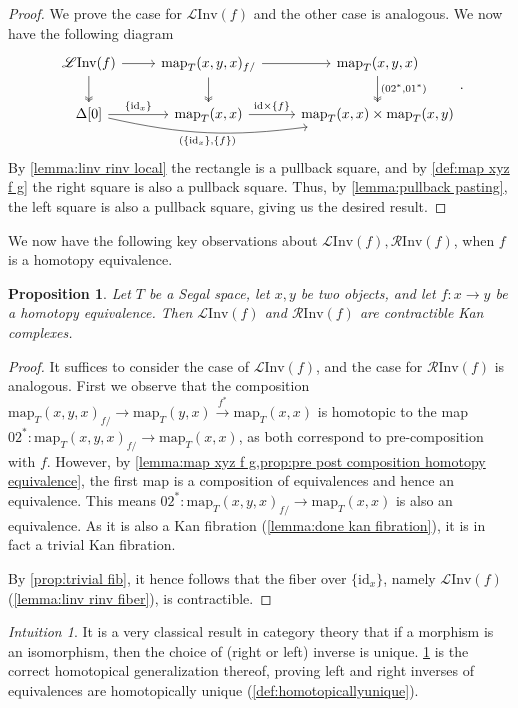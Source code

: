 \documentclass[11pt, a4paper]{amsart}
\newcommand{\map}{\mathrm{map}}
\newcommand{\id}{\mathrm{id}}
\newcommand{\LInv}{\mathscr{L}\mathrm{Inv}}
\newcommand{\RInv}{\mathscr{R}\mathrm{Inv}}
\newtheorem{proposition}[equation]{Proposition}
\theoremstyle{definition}
\theoremstyle{remark}
\newtheorem{intuition}[equation]{Intuition}
\numberwithin{equation}{section}
\begin{document}
\begin{proof}
 We prove the case for $\LInv(f)$ and the other case is analogous. We now have the following diagram
 \[ 
  \begin{tikzcd}
   \LInv(f) \arrow[r] \arrow[d, twoheadrightarrow] & \map_T(x,y,x)_{f/} \arrow[r] \arrow[d, twoheadrightarrow] & \map_T(x,y,x) \arrow[d, "{(02^*,01^*)}", twoheadrightarrow] \\
   \Delta[0] \arrow[rr, "{(\{\id_x\},\{f\})}"', bend right=10] \arrow[r, "\{\id_x\}"] &  \map_T(x,x) \arrow[r, "\id \times \{f\}"] & \map_T(x,x) \times \map_T(x,y)
  \end{tikzcd}.
 \]
 By \cref{lemma:linv rinv local} the rectangle is a pullback square, and by \cref{def:map xyz f g} the right square is also a pullback square. Thus, by \cref{lemma:pullback pasting}, the left square is also a pullback square, giving us the desired result.
\end{proof}

We now have the following key observations about $\LInv(f),\RInv(f)$, when $f$ is a homotopy equivalence.

\begin{proposition} \label{prop:linv rinv contractible}
  Let $T$ be a Segal space, let $x,y$ be two objects, and let $f\colon x \to y$ be a homotopy equivalence. Then $\LInv(f)$ and $\RInv(f)$ are contractible Kan complexes.
\end{proposition}

\begin{proof}
 It suffices to consider the case of $\LInv(f)$, and the case for $\RInv(f)$ is analogous. First we observe that the composition $\map_T(x,y,x)_{f/} \to \map_T(y,x) \xrightarrow{f^*} \map_T(x,x)$ is homotopic to the map $02^*\colon \map_T(x,y,x)_{f/} \to \map_T(x,x)$, as both correspond to pre-composition with $f$. However, by \cref{lemma:map xyz f g,prop:pre post composition homotopy equivalence}, the first map is a composition of equivalences and hence an equivalence. This means $02^*\colon \map_T(x,y,x)_{f/} \to \map_T(x,x)$ is also an equivalence. As it is also a Kan fibration (\cref{lemma:done kan fibration}), it is in fact a trivial Kan fibration.
 
 By \cref{prop:trivial fib}, it hence follows that the fiber over $\{\id_x\}$, namely $\LInv(f)$ (\cref{lemma:linv rinv fiber}), is contractible.
\end{proof}

\begin{intuition}
  It is a very classical result in category theory that if a morphism is an isomorphism, then the choice of (right or left) inverse is unique. \cref{prop:linv rinv contractible} is the correct homotopical generalization thereof, proving left and right inverses of equivalences are homotopically unique (\cref{def:homotopicallyunique}).
\end{intuition}
\end{document}
